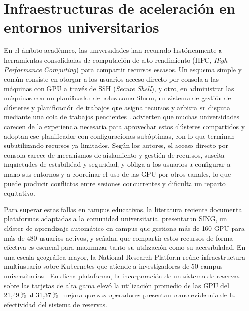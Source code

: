 \section{Infraestructuras de aceleración en entornos universitarios}\label{sec:entornos-universitarios}

En el ámbito académico, las universidades han recurrido históricamente a herramientas consolidadas de computación de alto rendimiento (HPC, \emph{High Performance Computing}) para compartir recursos escasos. Un esquema simple y común consiste en otorgar a los usuarios acceso directo por consola a las máquinas con GPU a través de SSH (\emph{Secure Shell}), y otro, en administrar las máquinas con un planificador de colas como Slurm, un sistema de gestión de clústeres y planificación de trabajos que asigna recursos y arbitra su disputa mediante una cola de trabajos pendientes \citep{slurm-overview-2026}. \citet{xu-sing-2025} advierten que muchas universidades carecen de la experiencia necesaria para aprovechar estos clústeres compartidos y adoptan ese planificador con configuraciones subóptimas, con lo que terminan subutilizando recursos ya limitados. Según los autores, el acceso directo por consola carece de mecanismos de aislamiento y gestión de recursos, suscita inquietudes de estabilidad y seguridad, y obliga a los usuarios a configurar a mano sus entornos y a coordinar el uso de las GPU por otros canales, lo que puede producir conflictos entre sesiones concurrentes y dificulta un reparto equitativo.

Para superar estas fallas en campus educativos, la literatura reciente documenta plataformas adaptadas a la comunidad universitaria. \citet{xu-sing-2025} presentaron SING, un clúster de aprendizaje automático en campus que gestiona más de 160 GPU para más de 480 usuarios activos, y señalan que compartir estos recursos de forma efectiva es esencial para maximizar tanto su utilización como su accesibilidad. En una escala geográfica mayor, la National Research Platform reúne infraestructura multiusuario sobre Kubernetes que atiende a investigadores de 50 campus universitarios \citep{weitzel-nrpreservation-2025}. En dicha plataforma, la incorporación de un sistema de reservas sobre las tarjetas de alta gama elevó la utilización promedio de las GPU del 21,49\,\% al 31,37\,\%, mejora que sus operadores presentan como evidencia de la efectividad del sistema de reservas.


